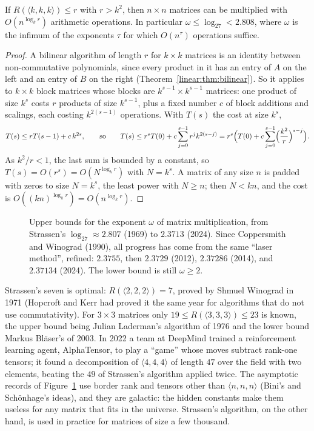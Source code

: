\begin{theorem}\label{linear:thm:omega}
If $R(\langle k,k,k\rangle)\le r$ with $r>k^2$, then $n\times n$ matrices can be multiplied with $O(n^{\log_kr})$ arithmetic operations.
In particular $\omega\le\log_27<2.808$, where $\omega$ is the infimum of the exponents $\tau$ for which $O(n^\tau)$ operations suffice.
\end{theorem}
\begin{proof}
A bilinear algorithm of length $r$ for $k\times k$ matrices is an identity between non-commutative polynomials, since every product
in it has an entry of $A$ on the left and an entry of $B$ on the right (Theorem~\ref{linear:thm:bilinear}). So it applies to $k\times k$
block matrices whose blocks are $k^{s-1}\times k^{s-1}$ matrices: one product of size $k^s$ costs $r$ products of size $k^{s-1}$, plus
a fixed number $c$ of block additions and scalings, each costing $k^{2(s-1)}$ operations. With $T(s)$ the cost at size $k^s$,
\[
T(s)\le rT(s-1)+c\,k^{2s},\qquad\text{so}\qquad T(s)\le r^sT(0)+c\sum_{j=0}^{s-1}r^jk^{2(s-j)}=r^s\Bigl(T(0)+c\sum_{j=0}^{s-1}\Bigl(\frac{k^2}r
\Bigr)^{s-j}\Bigr).
\]
As $k^2/r<1$, the last sum is bounded by a constant, so $T(s)=O(r^s)=O(N^{\log_kr})$ with $N=k^s$. A matrix of any size $n$ is padded
with zeros to size $N=k^s$, the least power with $N\ge n$; then $N<kn$, and the cost is $O((kn)^{\log_kr})=O(n^{\log_kr})$.
\end{proof}

\begin{figure}[ht]
\centering
{}
\caption{Upper bounds for the exponent $\omega$ of matrix multiplication, from Strassen's $\log_27\approx2.807$ (1969) to $2.3713$
(2024). Since Coppersmith and Winograd (1990), all progress has come from the same ``laser method'', refined: $2.3755$, then
$2.3729$ (2012), $2.37286$ (2014), and $2.37134$ (2024). The lower bound is still $\omega\ge2$.}
\label{linear:fig:omega}
\end{figure}

\begin{remark}
Strassen's seven is optimal: $R(\langle2,2,2\rangle)=7$, proved by Shmuel Winograd in 1971 (Hopcroft and Kerr had proved it the same
year for algorithms that do not use commutativity). For $3\times3$ matrices only $19\le R(\langle3,3,3\rangle)\le23$ is known, the upper
bound being Julian Laderman's algorithm of 1976 and the lower bound Markus Bl\"aser's of 2003. In 2022 a team at DeepMind trained
a reinforcement learning agent, AlphaTensor, to play a ``game'' whose moves subtract rank-one tensors; it found a decomposition of
$\langle4,4,4\rangle$ of length $47$ over the field with two elements, beating the $49$ of Strassen's algorithm applied twice. The
asymptotic records of Figure~\ref{linear:fig:omega} use border rank and tensors other than $\langle n,n,n\rangle$ (Bini's and Sch\"onhage's
ideas), and they are galactic: the hidden constants make them useless for any matrix that fits in the universe. Strassen's
algorithm, on the other hand, is used in practice for matrices of size a few thousand.
\end{remark}

